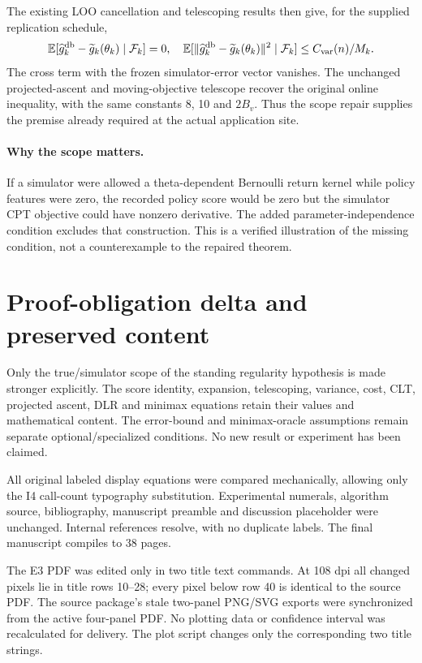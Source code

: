 \documentclass[10pt]{article}
\begin{document}
The existing LOO cancellation and telescoping results then give, for the supplied replication schedule,
\[
\mathbb E[\widehat g_k^{\rm db}-\widetilde g_k(\theta_k)\mid\mathcal F_k]=0,
\quad
\mathbb E[\|\widehat g_k^{\rm db}-\widetilde g_k(\theta_k)\|^2\mid\mathcal F_k]
\le C_{\rm var}(n)/M_k.
\]
The cross term with the frozen simulator-error vector vanishes. The unchanged projected-ascent and moving-objective telescope recover the original online inequality, with the same constants 8, 10 and $2B_v$. Thus the scope repair supplies the premise already required at the actual application site.

\paragraph{Why the scope matters.}
If a simulator were allowed a theta-dependent Bernoulli return kernel while policy features were zero, the recorded policy score would be zero but the simulator CPT objective could have nonzero derivative. The added parameter-independence condition excludes that construction. This is a verified illustration of the missing condition, not a counterexample to the repaired theorem.

\section*{Proof-obligation delta and preserved content}
Only the true/simulator scope of the standing regularity hypothesis is made stronger explicitly. The score identity, expansion, telescoping, variance, cost, CLT, projected ascent, DLR and minimax equations retain their values and mathematical content. The error-bound and minimax-oracle assumptions remain separate optional/specialized conditions. No new result or experiment has been claimed.

All original labeled display equations were compared mechanically, allowing only the I4 call-count typography substitution. Experimental numerals, algorithm source, bibliography, manuscript preamble and discussion placeholder were unchanged. Internal references resolve, with no duplicate labels. The final manuscript compiles to 38 pages.

The E3 PDF was edited only in two title text commands. At 108 dpi all changed pixels lie in title rows 10--28; every pixel below row 40 is identical to the source PDF. The source package's stale two-panel PNG/SVG exports were synchronized from the active four-panel PDF. No plotting data or confidence interval was recalculated for delivery. The plot script changes only the corresponding two title strings.
\end{document}
